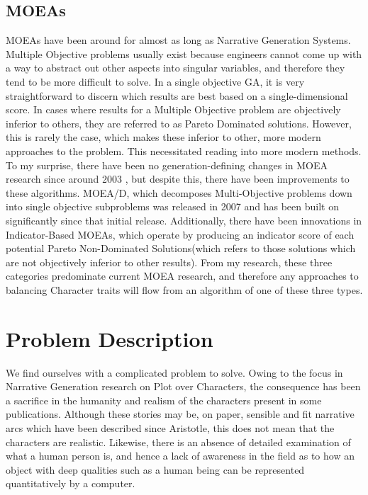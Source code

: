 \documentclass[11pt]{article}
\begin{document}
\subsection{MOEAs}
MOEAs have been around for almost as long as Narrative Generation Systems. Multiple Objective problems usually exist because engineers cannot come up with a way to abstract out other aspects into singular variables, and therefore they tend to be more difficult to solve. In a single objective GA, it is very straightforward to discern which results are best based on a single-dimensional score. In cases where results for a Multiple Objective problem are objectively inferior to others, they are referred to as Pareto Dominated solutions. However, this is rarely the case, which makes these inferior to other, more modern approaches to the problem\cite{AchievementScalarazingIndicatorBased}. This necessitated reading into more modern methods. To my surprise, there have been no generation-defining changes in MOEA research since around 2003 \cite{MOEASurvey1}, but despite this, there have been improvements to these algorithms. MOEA/D, which decomposes Multi-Objective problems down into single objective subproblems \cite{MOEAD} was released in 2007 and has been built on significantly since that initial release. Additionally, there have been innovations in Indicator-Based MOEAs, which operate by producing an indicator score of each potential Pareto Non-Dominated Solutions(which refers to those solutions which are not objectively inferior to other results). From my research, these three categories predominate current MOEA research, and therefore any approaches to balancing Character traits will flow from an algorithm of one of these three types.


\section{Problem Description}
We find ourselves with a complicated problem to solve. Owing to the focus in Narrative Generation research on Plot over Characters, the consequence has been a sacrifice in the humanity and realism of the characters present in some publications. Although these stories may be, on paper, sensible and fit narrative arcs which have been described since Aristotle, this does not mean that the characters are realistic. Likewise, there is an absence of detailed examination of what a human person is, and hence a lack of awareness in the field as to how an object with deep qualities such as a human being can be represented quantitatively by a computer. 
\end{document}
